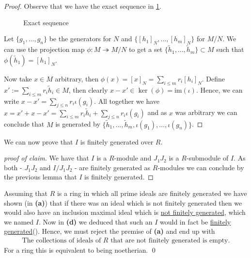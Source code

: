 \documentclass{article}
\newcommand{\contradiction}{\lightning}
\newcommand{\im}{\mathrm{im}}
\theoremstyle{definition}
\theoremstyle{plain}
\theoremstyle{remark}
\begin{document}
\begin{proof}
	Observe that we have the exact sequence in \cref{Ex11Figure}.
\begin{figure}[ht]
\centering
{}
\caption{Exact sequence}\label{Ex11Figure}
\end{figure}
	
	Let $\{g_1,...,g_n\}$ be the generators for $N$ and $\{[h_1]_N,...,[h_m]_N\}$ for $M/N$. We can use the projection map $\phi:M\twoheadrightarrow M/N$ to get a set $\{\tilde{h}_1,...,\tilde{h}_m\}\subset M$ such that $\phi(\tilde{h}_1)=[h_1]_N$.

	Now take $x\in M$ arbitrary, then $\phi(x)=[x]_N = \sum_{i\leq m}r_i[h_i]_N$. Define $x' := \sum_{i\leq m}r_i\tilde{h}_i\in M$, then clearly $x-x'\in \ker (\phi)=\im(\iota)$. Hence, we can write $x-x' = \sum_{j\leq n}r_i \iota(g_i)$.
	All together we have $x = x' + x - x' = \sum_{i\leq m}r_i\tilde{h}_i+ \sum_{j\leq n}r_i \iota(g_i)$ and as $x$ was arbitrary we can conclude that $M$ is generated by $\{\tilde{h}_1,...,\tilde{h}_m,\iota(g_1),...,\iota(g_n)\}$.
\end{proof}
We can now prove that $I$ is finitely generated over $R$.
\begin{proof}[proof of claim]
	We have that $I$ is a $R$-module and $J_1J_2$ is a $R$-submodule of $I$. As both - $J_1J_2$ and $I/J_1J_2$ - are finitely generated as $R$-modules we can conclude by the previous lemma that $I$ is finitely generated.
\end{proof}
Assuming that $R$ is a ring in which all prime ideals are finitely generated we have shown (in \textbf{(a)}) that if there was an ideal which is not finitely generated then we would also have an inclusion maximal ideal which is \underline{not finitely generated}, which we named $I$. Now in \textbf{(d)} we deduced that such an $I$ would in fact be \underline{finitely generated}(\contradiction). Hence, we must reject the premise of \textbf{(a)} and end up with 
\begin{align}
	\text{The collections of ideals of } R \text{ that are not finitely generated is empty}.
\end{align}
For a ring this is equivalent to being noetherian. \qed
\end{document}
